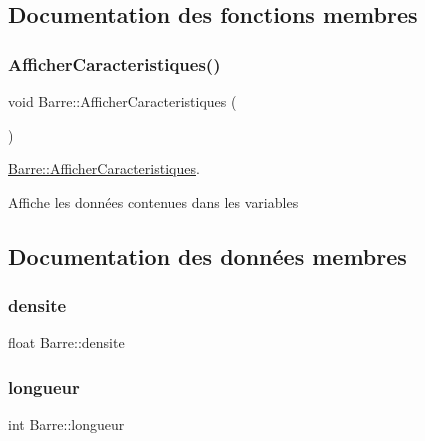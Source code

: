 \subsection{Documentation des fonctions membres}
\mbox{\label{class_barre_a2e844be9d7c76a74d61cb14243a1bade}} 
\subsubsection{\texorpdfstring{Afficher\+Caracteristiques()}{AfficherCaracteristiques()}}
{\footnotesize\ttfamily void Barre\+::\+Afficher\+Caracteristiques (\begin{DoxyParamCaption}{ }\end{DoxyParamCaption})}



\hyperlink{class_barre_a2e844be9d7c76a74d61cb14243a1bade}{Barre\+::\+Afficher\+Caracteristiques}. 

Affiche les données contenues dans les variables 

\subsection{Documentation des données membres}
\mbox{\label{class_barre_a1ed969f61782b23802f20ff7a5759f8d}} 
\subsubsection{\texorpdfstring{densite}{densite}}
{\footnotesize\ttfamily float Barre\+::densite\hspace{0.3cm}{\ttfamily [protected]}}

\mbox{\label{class_barre_a59f5637eaf9c15084deafab15f0de07d}} 
\subsubsection{\texorpdfstring{longueur}{longueur}}
{\footnotesize\ttfamily int Barre\+::longueur\hspace{0.3cm}{\ttfamily [protected]}}

